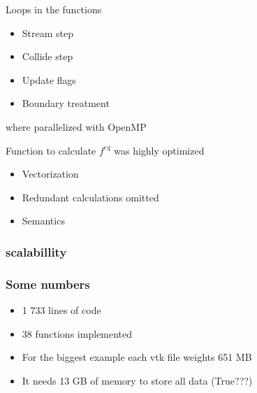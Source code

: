 \documentclass[10pt,a4paper]{beamer}
\begin{document}
\begin{frame}
	Loops in the functions 
	\begin{itemize}
	\item Stream step
	\item Collide step
	\item Update flags
	\item Boundary treatment
	\end{itemize}
	where parallelized with OpenMP
\end{frame}

\begin{frame}
	Function to calculate $f^{eq}$ was highly optimized
	\begin{itemize}
	\item Vectorization
	\item Redundant calculations omitted
	\item Semantics
	\end{itemize}
\end{frame}

\begin{frame}
	\frametitle{scalabillity}
\end{frame}

\begin{frame}
	\frametitle{Some numbers}
	\begin{itemize}
	\item 1 733 lines of code
	\item 38 functions implemented
	\item For the biggest example each vtk file weights 651 MB
	\item It needs 13 GB of memory to store all data (True???)
	\end{itemize}
\end{frame}
\end{document}
